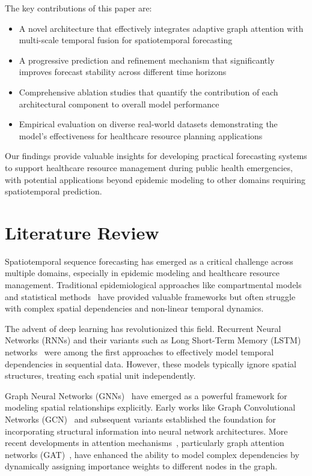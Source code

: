 \documentclass[lettersize, journal]{IEEEtran}
\begin{document}
The key contributions of this paper are:
\begin{itemize}
\item A novel architecture that effectively integrates adaptive graph attention with multi-scale temporal fusion for spatiotemporal forecasting
\item A progressive prediction and refinement mechanism that significantly improves forecast stability across different time horizons
\item Comprehensive ablation studies that quantify the contribution of each architectural component to overall model performance
\item Empirical evaluation on diverse real-world datasets demonstrating the model's effectiveness for healthcare resource planning applications
\end{itemize}

Our findings provide valuable insights for developing practical forecasting systems to support healthcare resource management during public health emergencies, with potential applications beyond epidemic modeling to other domains requiring spatiotemporal prediction.

\section{Literature Review}
Spatiotemporal sequence forecasting has emerged as a critical challenge across multiple domains, especially in epidemic modeling and healthcare resource management. Traditional epidemiological approaches like compartmental models~\cite{compartmentalmodel} and statistical methods~\cite{sirbasedmodel} have provided valuable frameworks but often struggle with complex spatial dependencies and non-linear temporal dynamics.

The advent of deep learning has revolutionized this field. Recurrent Neural Networks (RNNs) and their variants such as Long Short-Term Memory (LSTM) networks~\cite{lstm} were among the first approaches to effectively model temporal dependencies in sequential data. However, these models typically ignore spatial structures, treating each spatial unit independently.

Graph Neural Networks (GNNs)~\cite{gnn_survey} have emerged as a powerful framework for modeling spatial relationships explicitly. Early works like Graph Convolutional Networks (GCN)~\cite{gcn} and subsequent variants established the foundation for incorporating structural information into neural network architectures. More recent developments in attention mechanisms~\cite{attention_mechanisms}, particularly graph attention networks (GAT)~\cite{gat}, have enhanced the ability to model complex dependencies by dynamically assigning importance weights to different nodes in the graph.
\end{document}

